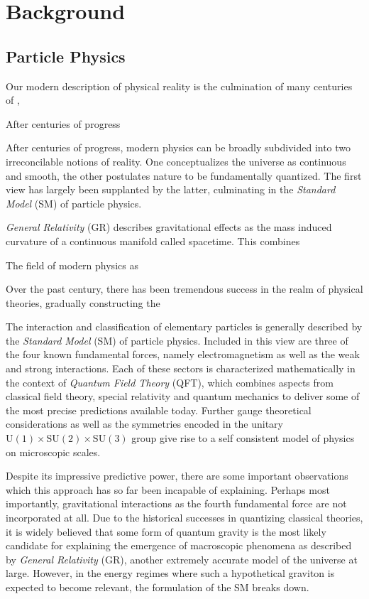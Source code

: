 \chapter{Background}
\label{ch:background}

\section{Particle Physics}
\label{sec:particle}

Our modern description of physical reality is the culmination of many centuries of , 

After centuries of progress

After centuries of progress, modern physics can be broadly subdivided into two irreconcilable notions of reality. One conceptualizes
the universe as continuous and smooth, the other postulates nature to be fundamentally quantized. The first view has largely been supplanted
by the latter, culminating in the \emph{Standard Model} (SM) of particle physics. 


\emph{General Relativity} (GR) describes gravitational effects as the mass induced curvature of a continuous manifold called spacetime.
This combines 



The field of modern physics as 

Over the past century, there has been tremendous success in the realm of physical theories, gradually constructing the 

The interaction and classification of elementary particles is generally described by the \emph{Standard Model} (SM) of particle physics.
Included in this view are three of the four known fundamental forces, namely electromagnetism as well as the weak and strong interactions.
Each of these
sectors is characterized mathematically in the context of \emph{Quantum Field Theory} (QFT), which combines aspects from classical field theory,
special relativity and quantum mechanics to deliver some of the most precise predictions available today. Further gauge theoretical considerations
as well as the symmetries encoded in the unitary $\text{U}(1) \times \text{SU}(2) \times \text{SU}(3)$ group give rise to a self consistent model
of physics on microscopic scales.

Despite its impressive predictive power, there are some important observations which this approach has so far been incapable of explaining.
Perhaps most importantly, gravitational interactions as the fourth fundamental force are not incorporated at all. Due to the historical successes
in quantizing classical theories, it is widely believed that some form of quantum gravity is the most likely candidate for explaining the emergence
of macroscopic phenomena as described by \emph{General Relativity} (GR), another extremely accurate model of the universe at large.
However, in the energy regimes where such a hypothetical graviton is expected to become relevant, the formulation of the SM breaks down.


